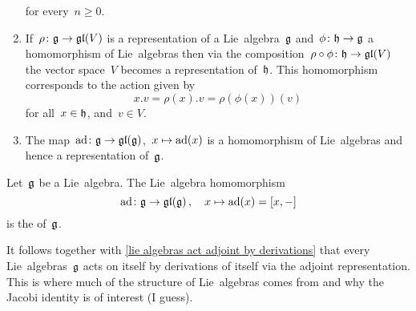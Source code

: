 \begin{examples}
\begin{enumerate}[leftmargin=*]
      for every~$n \geq 0$.
    \item
      If~$\rho \colon \mathfrak{g} \to \mathfrak{gl}(V)$ is a representation of a Lie~algebra~$\mathfrak{g}$ and~$\phi \colon \mathfrak{h} \to \mathfrak{g}$ a homomorphism of Lie~algebras then via the composition~$\rho \circ \phi \colon \mathfrak{h} \to \mathfrak{gl}(V)$ the vector space~$V$ becomes a representation of~$\mathfrak{h}$.
      This homomorphism corresponds to the action given by
      \[
        x.v = \rho(x).v = \rho(\phi(x))(v)
      \]
      for all~$x \in \mathfrak{h}$, and~$v \in V$.
    \item
      The map~$\operatorname{ad} \colon \mathfrak{g} \to \mathfrak{gl}(\mathfrak{g})$,~$x \mapsto \operatorname{ad}(x)$ is a homomorphism of Lie~algebras and hence a representation of~$\mathfrak{g}$.
  \end{enumerate}
\end{examples}


\begin{definition}
  Let~$\mathfrak{g}$ be a Lie~algebra.
  The  Lie~algebra homomorphism
  \[
    \operatorname{ad}
    \colon
    \mathfrak{g}
    \to
    \mathfrak{gl}(\mathfrak{g}) \,,
    \quad
    x
    \mapsto
    \operatorname{ad}(x)
    =
    [x,-]
  \]
  is the  of~$\mathfrak{g}$.
\end{definition}


\begin{remark}
  It follows together with \cref{lie algebras act adjoint by derivations} that every Lie~algebras~$\mathfrak{g}$ acts on itself by derivations of itself via the adjoint representation.
  This is where much of the structure of Lie~algebras comes from and why the Jacobi identity is of interest (I guess).
\end{remark}


